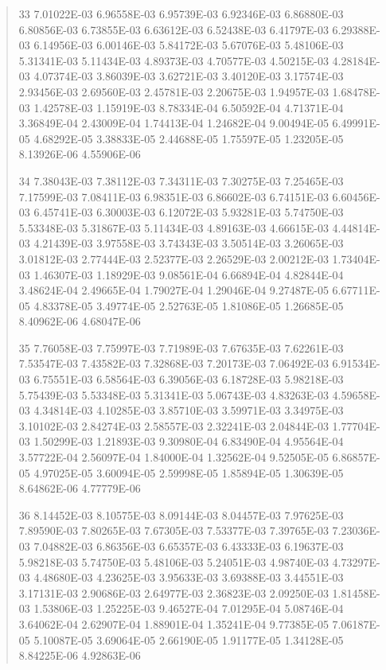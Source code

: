 \documentclass[letterpaper,10pt,english]{sphinxmanual}
\begin{document}
\begin{quote}
\begin{DUlineblock}{0em}
\item[] 33   7.01022E-03  6.96558E-03  6.95739E-03  6.92346E-03  6.86880E-03  6.80856E-03  6.73855E-03  6.63612E-03  6.52438E-03  6.41797E-03  6.29388E-03  6.14956E-03  6.00146E-03  5.84172E-03  5.67076E-03  5.48106E-03  5.31341E-03  5.11434E-03  4.89373E-03  4.70577E-03  4.50215E-03  4.28184E-03  4.07374E-03  3.86039E-03  3.62721E-03  3.40120E-03  3.17574E-03  2.93456E-03  2.69560E-03  2.45781E-03  2.20675E-03  1.94957E-03  1.68478E-03  1.42578E-03  1.15919E-03  8.78334E-04  6.50592E-04  4.71371E-04  3.36849E-04  2.43009E-04  1.74413E-04  1.24682E-04  9.00494E-05  6.49991E-05  4.68292E-05  3.38833E-05  2.44688E-05  1.75597E-05  1.23205E-05  8.13926E-06  4.55906E-06
\item[] 34   7.38043E-03  7.38112E-03  7.34311E-03  7.30275E-03  7.25465E-03  7.17599E-03  7.08411E-03  6.98351E-03  6.86602E-03  6.74151E-03  6.60456E-03  6.45741E-03  6.30003E-03  6.12072E-03  5.93281E-03  5.74750E-03  5.53348E-03  5.31867E-03  5.11434E-03  4.89163E-03  4.66615E-03  4.44814E-03  4.21439E-03  3.97558E-03  3.74343E-03  3.50514E-03  3.26065E-03  3.01812E-03  2.77444E-03  2.52377E-03  2.26529E-03  2.00212E-03  1.73404E-03  1.46307E-03  1.18929E-03  9.08561E-04  6.66894E-04  4.82844E-04  3.48624E-04  2.49665E-04  1.79027E-04  1.29046E-04  9.27487E-05  6.67711E-05  4.83378E-05  3.49774E-05  2.52763E-05  1.81086E-05  1.26685E-05  8.40962E-06  4.68047E-06
\item[] 35   7.76058E-03  7.75997E-03  7.71989E-03  7.67635E-03  7.62261E-03  7.53547E-03  7.43582E-03  7.32868E-03  7.20173E-03  7.06492E-03  6.91534E-03  6.75551E-03  6.58564E-03  6.39056E-03  6.18728E-03  5.98218E-03  5.75439E-03  5.53348E-03  5.31341E-03  5.06743E-03  4.83263E-03  4.59658E-03  4.34814E-03  4.10285E-03  3.85710E-03  3.59971E-03  3.34975E-03  3.10102E-03  2.84274E-03  2.58557E-03  2.32241E-03  2.04844E-03  1.77704E-03  1.50299E-03  1.21893E-03  9.30980E-04  6.83490E-04  4.95564E-04  3.57722E-04  2.56097E-04  1.84000E-04  1.32562E-04  9.52505E-05  6.86857E-05  4.97025E-05  3.60094E-05  2.59998E-05  1.85894E-05  1.30639E-05  8.64862E-06  4.77779E-06
\item[] 36   8.14452E-03  8.10575E-03  8.09144E-03  8.04457E-03  7.97625E-03  7.89590E-03  7.80265E-03  7.67305E-03  7.53377E-03  7.39765E-03  7.23036E-03  7.04882E-03  6.86356E-03  6.65357E-03  6.43333E-03  6.19637E-03  5.98218E-03  5.74750E-03  5.48106E-03  5.24051E-03  4.98740E-03  4.73297E-03  4.48680E-03  4.23625E-03  3.95633E-03  3.69388E-03  3.44551E-03  3.17131E-03  2.90686E-03  2.64977E-03  2.36823E-03  2.09250E-03  1.81458E-03  1.53806E-03  1.25225E-03  9.46527E-04  7.01295E-04  5.08746E-04  3.64062E-04  2.62907E-04  1.88901E-04  1.35241E-04  9.77385E-05  7.06187E-05  5.10087E-05  3.69064E-05  2.66190E-05  1.91177E-05  1.34128E-05  8.84225E-06  4.92863E-06

\end{DUlineblock}
\end{quote}
\end{document}
